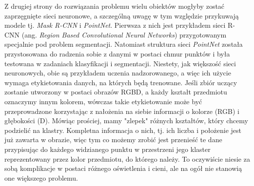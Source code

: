 \documentclass{article}
\begin{document}
Z drugiej strony do rozwiązania problemu wielu obiektów mogłyby zostać zaprzęgnięte sieci neuronowe, a szczególną uwagę w tym względzie przykuwają modele tj. \emph{Mask R-CNN} i \emph{PointNet}. Pierwsza z nich jest przykładem sieci R-CNN (ang. \emph{Region Based Convolutional Neural Networks}) przygotowanym specjalnie pod problem segmentacji. Natomiast struktura sieci \emph{PointNet} została przystosowana do radzenia sobie z danymi w postaci chmur punktów i była testowana w zadaniach klasyfikacji i segmentacji. Niestety, jak większość sieci neuronowych, obie są przykładem uczenia nadzorowanego, a więc ich użycie wymaga etykietowania danych, na których będą trenowane. Jeśli zbiór uczący zostanie utworzony w postaci obrazów RGBD, a każdy kształt przedmiotu oznaczymy innym kolorem, wówczas takie etykietowanie może być przeprowadzone korzystając z nałożenia na siebie informacji o kolorze (RGB) i głębokości (D). Mówiąc prościej, mamy "zlepek" różnych kształtów, który chcemy podzielić na klastry. Kompletna informacja o nich, tj. ich liczba i położenie jest już zawarta w obrazie, więc tym co możemy zrobić jest przenieść te dane przypisując do każdego widzianego punktu w przestrzeni jego klaster reprezentowany przez kolor przedmiotu, do którego należy. To oczywiście niesie za sobą komplikacje w postaci różnego oświetlenia i cieni, ale na ogół nie stanowią one większego problemu.

\newpage
\end{document}
